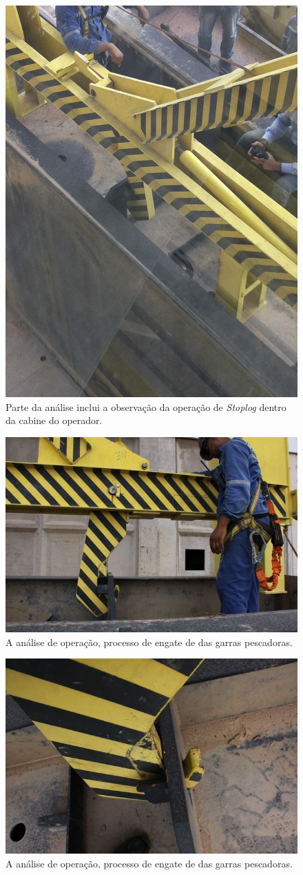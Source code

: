 \begin{figure}[h!]
    \centering \includegraphics[width=0.5\columnwidth]{figs/jirau/jirau_19}
    \caption{Parte da análise inclui a observação da operação de \emph{Stoplog} dentro da cabine do operador.}
    \label{fig:jirau19}
\end{figure}

\begin{figure}[h!]
    \centering \includegraphics[width=0.6\columnwidth]{figs/jirau/jirau_20}
    \caption{A análise de operação, processo de engate de das garras pescadoras.}
    \label{fig:jirau20}
\end{figure}

\begin{figure}[h!]
    \centering \includegraphics[width=0.6\columnwidth]{figs/jirau/jirau_21}
    \caption{A análise de operação, processo de engate de das garras pescadoras.}
    \label{fig:jirau21}
\end{figure}

